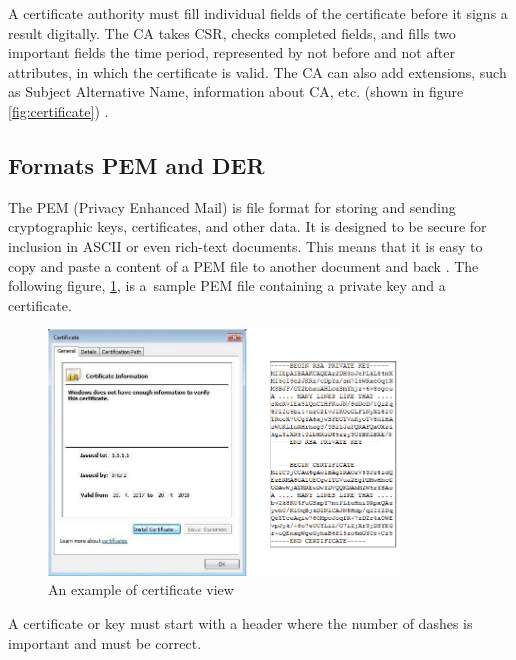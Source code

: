 \documentclass[
  12pt, 
  digital, %
  notable,   %
  nolof,     %
  nolot,     %
]{fithesis3}
\begin{document}
A certificate authority must fill individual fields of the certificate before it signs a 
result digitally. The CA takes CSR, checks completed fields, and fills two important fields 
the time period, represented by not before and not after attributes, in which the certificate is 
valid. The CA can also add extensions, such as Subject Alternative Name, information 
about CA, etc. (shown in figure \ref{fig:certificate}) \cite{dostalek2016velky}.

\subsection{Formats PEM and DER}\label{formats}
The PEM (Privacy Enhanced Mail) is  file format for storing and sending cryptographic keys, 
certificates, and other data. It is designed to be secure for inclusion in ASCII or even rich-text 
documents. This means that it is easy to copy and paste a content of a PEM file to another 
document and back \cite{howToSsl}. The following figure, \ref{fig:vzorPEM-DER}, is a~sample PEM 
file containing a private key and a certificate. 

\begin{figure}[th]
	\centering
	\includegraphics[width=0.83\textwidth]{pem-der-fig}
	\caption{An example of certificate view}
	\label{fig:vzorPEM-DER}
\end{figure}

A certificate or key must start with a header where the number of dashes is important and must be 
correct. 
\end{document}
